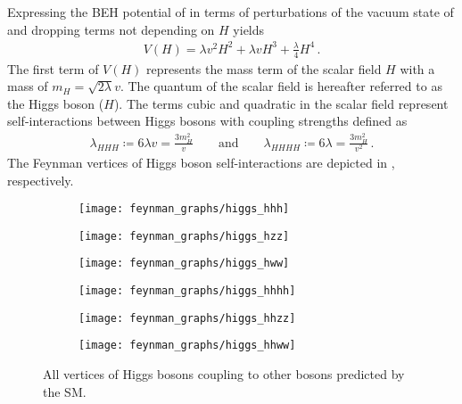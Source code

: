 Expressing the BEH potential of  in terms of
perturbations of the vacuum state of  and dropping
terms not depending on $H$ yields
\begin{align}
  V(H) =
  \lambda v^2 H^2
  + \lambda v H^3
  + \frac{\lambda}{4} H^4 \,\text{.}
  \label{eq:beh_potential}
\end{align}
The first term of $V(H)$ represents the mass term of the scalar field $H$ with a
mass of $m_H = \sqrt{2\lambda} v$. The quantum of the scalar field is hereafter
referred to as the Higgs boson ($H$). The terms cubic and quadratic in the
scalar field represent self-interactions between Higgs bosons with coupling
strengths defined as
\begin{align*}
  \lambda_{HHH} \coloneqq 6 \lambda v = \frac{3 m_{H}^2}{v} \qquad \text{and} \qquad \lambda_{HHHH} \coloneqq 6 \lambda = \frac{3 m_{H}^2}{v^2} \,\text{.}
\end{align*}
The Feynman vertices of Higgs boson self-interactions are depicted in
, respectively.

\begin{figure}[htbp]
  \centering

  \begin{subfigure}{0.33\textwidth}
    \centering
    \texttt{[image: feynman\_graphs/higgs\_hhh]}
    \subcaption{}
    \label{fig:vertex_hhh}
  \end{subfigure}%
  \begin{subfigure}{0.33\textwidth}
    \centering
    \texttt{[image: feynman\_graphs/higgs\_hzz]}
    \subcaption{}
  \end{subfigure}%
  \begin{subfigure}{0.33\textwidth}
    \centering
    \texttt{[image: feynman\_graphs/higgs\_hww]}
    \subcaption{}
  \end{subfigure}

  \vspace{1em}

  \begin{subfigure}{0.33\textwidth}
    \centering
    \texttt{[image: feynman\_graphs/higgs\_hhhh]}
    \subcaption{}
    \label{fig:vertex_hhhh}
  \end{subfigure}%
  \begin{subfigure}{0.33\textwidth}
    \centering
    \texttt{[image: feynman\_graphs/higgs\_hhzz]}
    \subcaption{}
  \end{subfigure}%
  \begin{subfigure}{0.33\textwidth}
    \centering
    \texttt{[image: feynman\_graphs/higgs\_hhww]}
    \subcaption{}
  \end{subfigure}

  \caption{All vertices of Higgs bosons coupling to other bosons predicted by
    the SM.}%
  \label{fig:higgs_vertices}
\end{figure}

